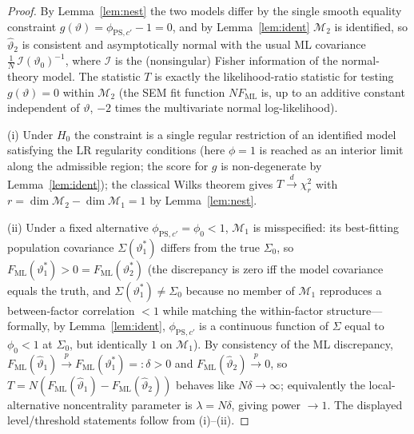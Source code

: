 \documentclass{amsart}
\theoremstyle{remark}
\begin{document}
\begin{proof}
By Lemma~\ref{lem:nest} the two models differ by the single smooth equality
constraint $g(\vartheta)=\phi_{\mathrm{PS},c'}-1=0$, and by Lemma~\ref{lem:ident}
$\mathcal M_2$ is identified, so $\hat\vartheta_2$ is consistent and asymptotically
normal with the usual ML covariance $\frac1N\,\mathcal I(\vartheta_0)^{-1}$, where
$\mathcal I$ is the (nonsingular) Fisher information of the normal-theory model.
The statistic $T$ is exactly the likelihood-ratio statistic for testing
$g(\vartheta)=0$ within $\mathcal M_2$ (the SEM fit function $NF_{\mathrm{ML}}$ is,
up to an additive constant independent of $\vartheta$, $-2$ times the multivariate
normal log-likelihood). 

(i) Under $H_0$ the constraint is a single regular restriction of an identified
model satisfying the LR regularity conditions (here $\phi=1$ is reached as an
interior limit along the admissible region; the score for $g$ is non-degenerate by
Lemma~\ref{lem:ident}); the classical Wilks theorem gives $T\xrightarrow{d}\chi^2_r$
with $r=\dim\mathcal M_2-\dim\mathcal M_1=1$ by Lemma~\ref{lem:nest}.

(ii) Under a fixed alternative $\phi_{\mathrm{PS},c'}=\phi_0<1$, $\mathcal M_1$ is
misspecified: its best-fitting population covariance $\Sigma(\vartheta_1^\ast)$
differs from the true $\Sigma_0$, so $F_{\mathrm{ML}}(\vartheta_1^\ast)>0
=F_{\mathrm{ML}}(\vartheta_2^\ast)$ (the discrepancy is zero iff the model
covariance equals the truth, and $\Sigma(\vartheta_1^\ast)\neq\Sigma_0$ because no
member of $\mathcal M_1$ reproduces a between-factor correlation $<1$ while
matching the within-factor structure---formally, by Lemma~\ref{lem:ident},
$\phi_{\mathrm{PS},c'}$ is a continuous function of $\Sigma$ equal to $\phi_0<1$ at
$\Sigma_0$, but identically $1$ on $\mathcal M_1$). By consistency of the ML
discrepancy, $F_{\mathrm{ML}}(\hat\vartheta_1)\xrightarrow{p}F_{\mathrm{ML}}(\vartheta_1^\ast)=:\delta>0$
and $F_{\mathrm{ML}}(\hat\vartheta_2)\xrightarrow{p}0$, so
$T=N(F_{\mathrm{ML}}(\hat\vartheta_1)-F_{\mathrm{ML}}(\hat\vartheta_2))$ behaves like
$N\delta\to\infty$; equivalently the local-alternative noncentrality parameter is
$\lambda=N\delta$, giving power $\to1$. The displayed level/threshold statements
follow from (i)--(ii). \end{proof}
\end{document}
